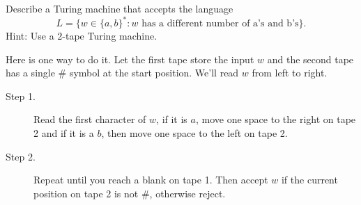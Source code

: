 \documentclass[12pt,answers]{exam}
\begin{document}
\begin{questions}
\question Describe a Turing machine that accepts the language 
$$L = \{w \in \{a, b\}^* : w \text{ has a different number of a's and b's} \}.$$
Hint: Use a 2-tape Turing machine.
\begin{solution}
Here is one way to do it. Let the first tape store the input $w$ and the second tape has a single $\#$ symbol at the start position. We'll read $w$ from left to right.
\begin{description}
\item[Step 1.] Read the first character of $w$, if it is $a$, move one space to the right on tape 2 and if it is a $b$, then move one space to the left on tape 2. 
\item[Step 2.] Repeat until you reach a blank on tape 1.  Then accept $w$ if the current position on tape 2 is not $\#$, otherwise reject. 
\end{description}
\end{solution}
\vfill

\end{questions}
\end{document}
